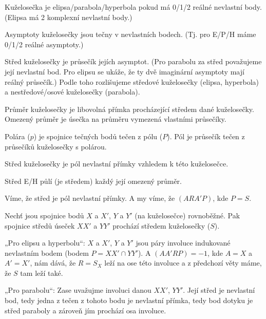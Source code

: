 \documentclass[12pt]{article}					%
\begin{document}
\begin{definice}
	Kuželosečka je elipsa/parabola/hyperbola pokud má 0/1/2 reálné nevlastní body. (Elipsa má 2 komplexní nevlastní body.)

	Asymptoty kuželosečky jsou tečny v nevlastních bodech. (Tj. pro E/P/H máme 0/1/2 reálné asymptoty.)

	Střed kuželosečky je průsečík jejích asymptot. (Pro parabolu za střed považujeme její nevlastní bod. Pro elipsu se ukáže, že ty dvě imaginární asymptoty mají reálný průsečík.) Podle toho rozlišujeme středové kuželosečky (elipsa, hyperbola) a nestředové/osové kuželosečky (parabola).

	Průměr kuželosečky je libovolná přímka procházející středem dané kuželosečky. Omezený průměr je úsečka na průměru vymezená vlastními průsečíky.
\end{definice}

\begin{poznamka}
	Polára ($p$) je spojnice tečných bodů tečen z pólu ($P$). Pól je průsečík tečen z průsečíků kuželosečky s polárou.
\end{poznamka}

\begin{dusledek}
	Střed kuželosečky je pól nevlastní přímky vzhledem k této kuželosečce.
\end{dusledek}

\begin{veta}
	Střed E/H půlí (je středem) každý její omezený průměr.

	\begin{dukazin}
		Víme, že střed je pól nevlastní přímky. A my víme, že $(ARA'P)$, kde $P = S$.
	\end{dukazin}
\end{veta}

\begin{veta}
	Nechť jsou spojnice bodů $X$ a $X'$, $Y$ a $Y'$ (na kuželosečce) rovnoběžné. Pak spojnice středů úseček $XX'$ a $YY'$ prochází středem kuželosečky ($S$).

	\begin{dukazin}
		„Pro elipsu a hyperbolu“: $X$ a $X'$, $Y$ a $Y'$ jsou páry involuce indukované nevlastním bodem (bodem $P = XX' \cap YY'$). A $(AA'RP) = -1$, kde $A = X$ a $A' = X'$, nám dává, že $R = S_X$ leží na ose této involuce a z předchozí věty máme, že $S$ tam leží také.

		„Pro parabolu“: Zase uvažujme involuci danou $XX'$, $YY'$. Její střed je nevlastní bod, tedy jedna z tečen z tohoto bodu je nevlastní přímka, tedy bod dotyku je střed paraboly a zároveň jím prochází osa involuce.
	\end{dukazin}
\end{veta}
\end{document}
